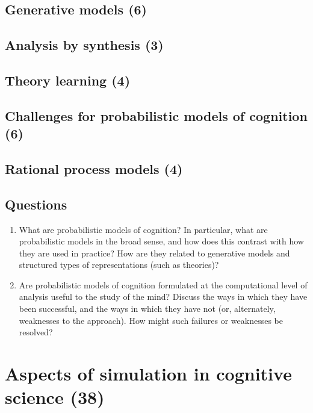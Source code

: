 \documentclass{article}
\begin{document}
\subsection{Generative models (6)}

\subsection{Analysis by synthesis (3)}

\subsection{Theory learning (4)}

\subsection{Challenges for probabilistic models of cognition (6)}

\subsection{Rational process models (4)}

\subsection{Questions}

\begin{enumerate}
\item What are probabilistic models of cognition? In particular, what are probabilistic models in the broad sense, and how does this contrast with how they are used in practice? How are they related to generative models and structured types of representations (such as theories)?
\item Are probabilistic models of cognition formulated at the computational level of analysis useful to the study of the mind? Discuss the ways in which they have been successful, and the ways in which they have not (or, alternately, weaknesses to the approach). How might such failures or weaknesses be resolved?
\end{enumerate}


\newpage
\section{Aspects of simulation in cognitive science (38)}
\end{document}
